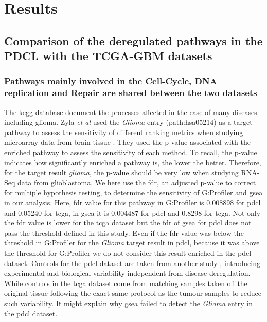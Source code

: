 \section{Results}

\subsection{Comparison of the deregulated pathways in the PDCL with the TCGA-GBM datasets}

\subsubsection{Pathways mainly involved in the Cell-Cycle, DNA replication and Repair are shared between the two datasets}

The \acrshort{kegg} database document the processes affected in the case of many diseases including glioma.
Zyla \textit{et al} used the \textit{Glioma} entry (path:hsa05214) as a target pathway to assess the sensitivity of different ranking metrics when studying microarray data from brain tissue \cite*{Zyla2017}.
They used the p-value associated with the enriched pathway to assess the sensitivity of each method.
To recall, the p-value indicates how significantly enriched a pathway is, the lower the better.
Therefore, for the target result \textit{glioma}, the p-value should be very low when studying RNA-Seq data from glioblastoma.
We here use the \acrshort{fdr}, an adjusted p-value to correct for multiple hypothesis testing, to determine the sensitivity of G:Profiler and \acrshort{gsea} in our analysis.
Here, \acrshort{fdr} value for this pathway in G:Profiler is 0.008898 for \acrshort{pdcl} and 0.05240 for \acrshort{tcga}, in \acrshort{gsea} it is 0.004487 for \acrshort{pdcl} and 0.8298 for \acrshort{tcga}.
Not only the \acrshort{fdr} value is lower for the \acrshort{tcga} dataset but the \acrshort{fdr} of \acrshort{gsea} for \acrshort{pdcl} does not pass the threshold defined in this study.
Even if the \acrshort{fdr} value was below the threshold in G:Profiler for the \textit{Glioma} target result in \acrshort{pdcl}, because it was above the threshold for G:Profiler we do not consider this result enriched in the \acrshort{pdcl} dataset.
Controls for the \acrshort{pdcl} dataset are taken from another study \cite*{Lundin2018}, introducing experimental and biological variability independent from disease deregulation.
While controls in the \acrshort{tcga} dataset come from matching samples taken off the original tissue following the exact same protocol as the tumour samples to reduce such variability.
It might explain why \acrshort{gsea} failed to detect the \textit{Glioma} entry in the \acrshort{pdcl} dataset.


